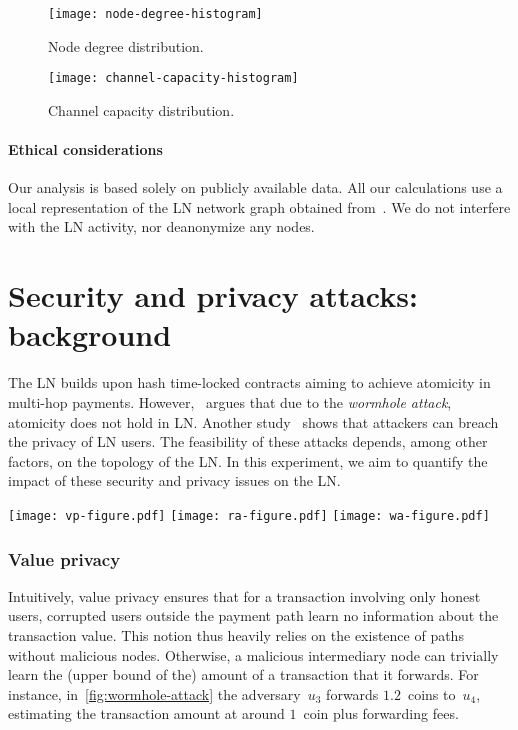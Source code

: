 \begin{figure}[tb]
	\centering
	\texttt{[image: node-degree-histogram]}
	\caption{Node degree distribution.}
	\label{fig:node-degree-histogram}
\end{figure}

\begin{figure}[tb]
	\centering
	\texttt{[image: channel-capacity-histogram]}
	\caption{Channel capacity distribution.}
	\label{fig:channel-capacity-histogram}
\end{figure}

\paragraph{Ethical considerations} 
Our analysis is based solely on publicly available data.
All our calculations use a local representation of the LN network graph obtained from~\cite{fiatjaf2020}.
We do not interfere with the LN activity, nor deanonymize any nodes.


\section{Security and privacy attacks: background}
\label{sec:sec-priv-attacks}

The LN builds upon hash time-locked contracts aiming to achieve atomicity in multi-hop payments.
However,~\cite{Malavolta2019} argues that due to the \emph{wormhole attack}, atomicity does not hold in LN\@.
Another study~\cite{Malavolta2017} shows that attackers can breach the privacy of LN users.
The feasibility of these attacks depends, among other factors, on the topology of the LN\@.
In this experiment, we aim to quantify the impact of these security and privacy issues on the LN\@.

\begin{figure*}[tb]
	\texttt{[image: vp-figure.pdf]}
	\vspace{0.3cm}
	\texttt{[image: ra-figure.pdf]}
	\vspace{0.3cm}
	\texttt{[image: wa-figure.pdf]}
	\caption{An illustrative example of value privacy (top), relationship anonymity (middle), and the wormhole attack (bottom).}
	\label{fig:wormhole-attack}
\end{figure*}

\subsubsection*{Value privacy}
Intuitively, value privacy ensures that for a transaction involving only honest users, corrupted users outside the payment path learn no information about the transaction value.
This notion thus heavily relies on the existence of paths without malicious nodes.
Otherwise, a malicious intermediary node can trivially learn the (upper bound of the) amount of a transaction that it forwards.
For instance, in~\cref{fig:wormhole-attack} the adversary~$u_3$ forwards $1.2$~coins to~$u_4$, estimating the transaction amount at around $1$~coin plus forwarding fees.

